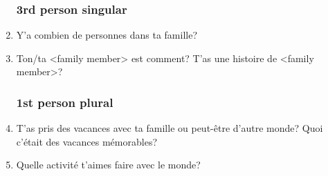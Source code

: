 \begin{enumerate}
    \subsubsection{3rd person singular}
      \item Y'a combien de personnes dans ta famille?\\
      \item Ton/ta <family member> est comment? T'as une histoire de <family member>?
    \subsubsection{1st person plural}
      \item T'as pris des vacances avec ta famille ou peut-être d'autre monde? Quoi c'était des vacances mémorables? \\
      \item Quelle activité t'aimes faire avec le monde? \\

\end{enumerate}
